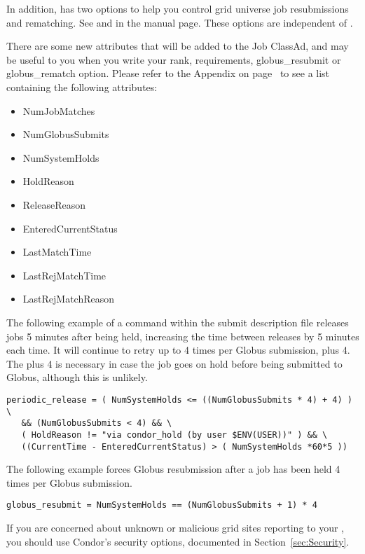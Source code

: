 In addition,  has two options to help you control
grid universe job resubmissions and rematching.  See  and
 in the  manual page.
These options are independent of .

There are some new attributes that will be added to the Job ClassAd,
and may be useful to you when you write your rank, requirements,
globus\_resubmit or globus\_rematch option. Please refer to
the Appendix on page~\pageref{sec:Job-ClassAd-Attributes} 
to see a list containing the following attributes:

\begin{itemize}
\item NumJobMatches
\item NumGlobusSubmits
\item NumSystemHolds
\item HoldReason
\item ReleaseReason
\item EnteredCurrentStatus
\item LastMatchTime
\item LastRejMatchTime
\item LastRejMatchReason
\end{itemize}

The following example of a command within the submit description file
releases jobs 5 minutes after being held,
increasing the time between releases by 5 minutes each time.
It will continue to retry up to 4 times per Globus
submission, plus 4.
The plus 4 is necessary in case
the job goes on hold before being submitted to Globus, although
this is unlikely.

\footnotesize
\begin{verbatim}
periodic_release = ( NumSystemHolds <= ((NumGlobusSubmits * 4) + 4) ) \
   && (NumGlobusSubmits < 4) && \
   ( HoldReason != "via condor_hold (by user $ENV(USER))" ) && \
   ((CurrentTime - EnteredCurrentStatus) > ( NumSystemHolds *60*5 ))
\end{verbatim}
\normalsize

The following example forces Globus resubmission after a job has
been held 4 times per Globus submission.

\footnotesize
\begin{verbatim}
globus_resubmit = NumSystemHolds == (NumGlobusSubmits + 1) * 4
\end{verbatim}
\normalsize

If you are concerned about unknown or malicious grid sites reporting
to your , you should use Condor's security options,
documented in Section~\ref{sec:Security}.
